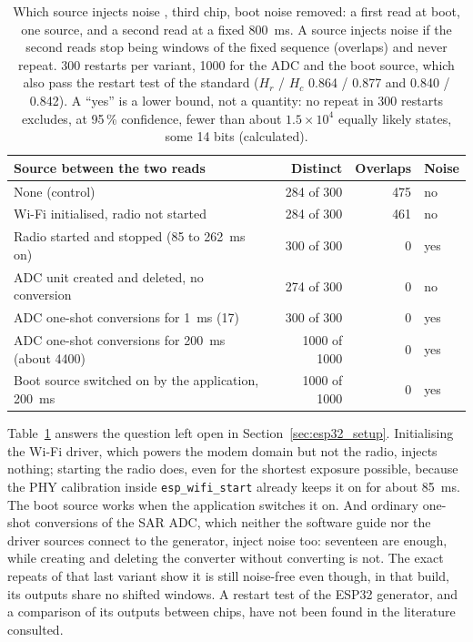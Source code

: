 \begin{table}[htbp]
\centering
\caption{Which source injects noise \meas{}, third chip, boot noise
removed: a first read at boot, one source, and a second read at a fixed
800~ms. A source injects noise if the second reads stop being windows of
the fixed sequence (overlaps) and never repeat. 300 restarts per variant,
1000 for the ADC and the boot source, which also pass the restart test
of the standard ($H_r$ / $H_c$ 0.864 / 0.877 and 0.840 / 0.842). A
``yes'' is a lower bound, not a quantity: no repeat in 300 restarts
excludes, at 95\,\% confidence, fewer than about $1.5\times10^4$ equally
likely states, some 14 bits (calculated).}
\label{tab:esp32_fuentes}
\footnotesize
\begin{tabular}{@{}lrrl@{}}
\toprule
Source between the two reads & Distinct & Overlaps & Noise \\
\midrule
None (control)                                   & 284 of 300  & 475 & no \\
Wi-Fi initialised, radio not started             & 284 of 300  & 461 & no \\
Radio started and stopped (85 to 262~ms on)      & 300 of 300  & 0   & yes \\
ADC unit created and deleted, no conversion      & 274 of 300  & 0   & no \\
ADC one-shot conversions for 1~ms (17)           & 300 of 300  & 0   & yes \\
ADC one-shot conversions for 200~ms (about 4400) & 1000 of 1000 & 0  & yes \\
Boot source switched on by the application, 200~ms & 1000 of 1000 & 0 & yes \\
\bottomrule
\end{tabular}
\end{table}

Table~\ref{tab:esp32_fuentes} answers the question left open in
Section~\ref{sec:esp32_setup}. Initialising the Wi-Fi driver, which
powers the modem domain but not the radio, injects nothing; starting the
radio does, even for the shortest exposure possible, because the PHY
calibration inside \texttt{esp\_wifi\_start} already keeps it on for
about 85~ms. The boot source works when the application switches it on.
And ordinary one-shot conversions of the SAR ADC, which neither the
software guide nor the driver sources connect to the generator, inject
noise too: seventeen are enough, while creating and deleting the
converter without converting is not. The exact repeats of that last
variant show it is still noise-free even though, in that build, its
outputs share no shifted windows. A restart test of the ESP32 generator,
and a comparison of its outputs between chips, have not been found in
the literature consulted.

